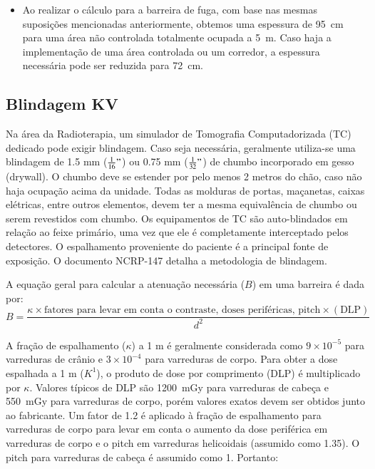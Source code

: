\documentclass[11pt,a4paper]{article}
\begin{document}
\begin{tcolorbox}
\begin{itemize}[label=\textcolor{CarnationPink}{$\star$}]
			\item Ao realizar o cálculo para a barreira de fuga, com base nas mesmas suposições mencionadas anteriormente, obtemos uma espessura de \SI{95}{\centi\meter} para uma área não controlada totalmente ocupada a \SI{5}{\meter}. Caso haja a implementação de uma área controlada ou um corredor, a espessura necessária pode ser reduzida para \SI{72}{\centi\meter}.
		\end{itemize}
	\end{tcolorbox}
	
\subsection*{Blindagem KV}

	Na área da Radioterapia, um simulador de Tomografia Computadorizada (TC) dedicado pode exigir blindagem. Caso seja necessária, geralmente utiliza-se uma blindagem de 1.5 mm (\(\frac{1}{16}"\)) ou 0.75 mm (\(\frac{1}{32}"\)) de chumbo incorporado em gesso (drywall). O chumbo deve se estender por pelo menos 2 metros do chão, caso não haja ocupação acima da unidade. Todas as molduras de portas, maçanetas, caixas elétricas, entre outros elementos, devem ter a mesma equivalência de chumbo ou serem revestidos com chumbo. Os equipamentos de TC são auto-blindados em relação ao feixe primário, uma vez que ele é completamente interceptado pelos detectores. O espalhamento proveniente do paciente é a principal fonte de exposição. O documento NCRP-147 detalha a metodologia de blindagem.

	A equação geral para calcular a atenuação necessária (\(B\)) em uma barreira é dada por:
	\begin{equation}
	B = \frac{\kappa \times  \text{fatores para levar em conta o contraste, doses periféricas, pitch} \times  (\text{DLP})}{d^2}
	\end{equation}

	A fração de espalhamento (\(\kappa\)) a 1 m é geralmente considerada como \(9 \times 10^{-5}\) para varreduras de crânio e \(3 \times 10^{-4}\) para varreduras de corpo. Para obter a dose espalhada a 1 m (\(K^1\)), o produto de dose por comprimento (DLP) é multiplicado por \(\kappa\). Valores típicos de DLP são \SI{1200}{\milli\gray} para varreduras de cabeça e \SI{550}{\milli\gray} para varreduras de corpo, porém valores exatos devem ser obtidos junto ao fabricante. Um fator de 1.2 é aplicado à fração de espalhamento para varreduras de corpo para levar em conta o aumento da dose periférica em varreduras de corpo e o pitch em varreduras helicoidais (assumido como 1.35). O pitch para varreduras de cabeça é assumido como 1. Portanto:
\end{document}
